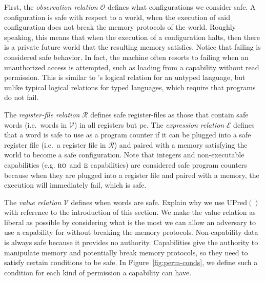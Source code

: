 \documentclass[format=acmsmall, review=false, screen=true]{acmart}
\renewcommand{\figurename}{Figure}
\newcommand{\pcreg}{\mathrm{pc}}
\newcommand{\asmType}{\plaindom{AsmType}}
\newcommand{\plaindom}[1]{\mathrm{#1}}
\newcommand{\UPred}[1]{\plaindom{UPred}(#1)}
\newcommand{\intr}[2]{\mathcal{#1}}
\newcommand{\valueintr}[1]{\intr{V}{#1}}
\newcommand{\exprintr}[1]{\intr{E}{#1}}
\newcommand{\regintr}[1]{\intr{R}{#1}}
\newcommand{\stdvr}{\valueintr{\asmType}}
\newcommand{\stder}{\exprintr{\asmType}}
\newcommand{\stdrr}{\regintr{\asmType}}
\newcommand{\observations}{\mathcal{O}}
\newcommand{\plainperm}[1]{\textsc{#1}}
\newcommand{\readonly}{\plainperm{ro}}
\newcommand{\entry}{\plainperm{e}}
\newcommand{\itoplassug}[1]
    {{\color{Blue} #1}}
\begin{document}
First, the \emph{observation relation} $\observations$ defines what
configurations we consider safe. A configuration is safe
with respect to a world, when the execution of said configuration does not break
the memory protocols of the world. Roughly speaking, this means that when the
execution of a configuration halts, then there is a private future world that
the resulting memory satisfies. Notice that failing is considered safe behavior.
In fact, the machine often resorts to failing when an unauthorized access is
attempted, such as loading from a capability without read permission. This is
similar to \citet{Devriese:2016ObjCap}'s logical relation for an untyped
language, but unlike typical logical relations for typed languages, which
require that programs do not fail.

The \emph{register-file relation} $\stdrr$ defines safe register-files as those
that contain safe words (i.e.\ words in $\stdvr$) in all registers but $\pcreg$.
The \emph{expression relation} $\stder$ defines that a word is safe to use as a
program counter if it can be plugged into a safe register file (i.e.\ a register
file in $\stdrr$) and paired with a memory satisfying the world to become a safe
configuration. Note that integers and non-executable capabilities (e.g.
$\readonly$ and $\entry$ capabilities) are considered safe program counters
because when they are plugged into a register file and paired with a memory, the
execution will immediately fail, which is safe.

The \emph{value relation} $\stdvr$ defines when words are safe.
\itoplassug{Explain why we use $\UPred{}$ with reference to the introduction of this section.}
We make the
value relation as liberal as possible by considering what is the most we can
allow an adversary to use a capability for without breaking the memory
protocols. Non-capability data is always safe because it provides no
authority. Capabilities give the authority to manipulate memory and potentially
break memory protocols, so they need to satisfy certain conditions to be
safe. In \figurename~\ref{fig:perm-conds}, we define such a condition for each
kind of permission a capability can have.
\end{document}
